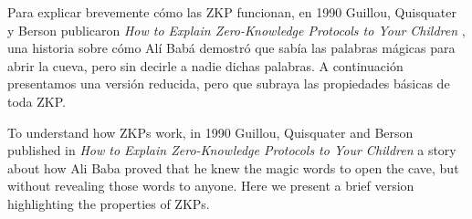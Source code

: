 Para explicar brevemente cómo las ZKP funcionan, en 1990 Guillou, Quisquater y Berson publicaron \textit{How to Explain Zero-Knowledge Protocols to Your Children} \citep{ZKPcave:story}, una historia sobre cómo Alí Babá demostró que sabía las palabras mágicas para abrir la cueva, pero sin decirle a nadie dichas palabras. A continuación presentamos una versión reducida, pero que subraya las propiedades básicas de toda ZKP.

To understand how ZKPs work, in 1990 Guillou, Quisquater and Berson published in \textit{How to Explain Zero-Knowledge Protocols to Your Children} \citep{ZKPcave:story} a story about how Ali Baba proved that he knew the magic words to open the cave, but without revealing those words to anyone. Here we present a brief version highlighting the properties of ZKPs.

\hfil


